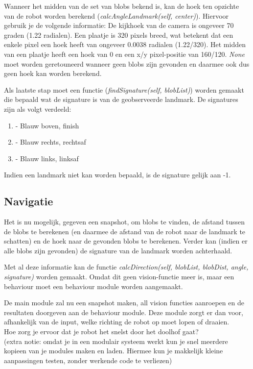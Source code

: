 \documentclass[a4paper]{article}
\begin{document}
Wanneer het midden van de set van blobs bekend is, kan de hoek ten opzichte van de robot worden berekend (\textit{calcAngleLandmark(self, center)}). Hiervoor gebruik je de volgende informatie:
De kijkhoek van de camera is ongeveer 70 graden (1.22 radialen). Een plaatje is 320 pixels breed, wat betekent dat een enkele pixel een hoek heeft van ongeveer 0.0038 radialen (1.22/320). Het midden van een plaatje heeft een hoek van 0 en een x/y pixel-positie van 160/120. \textit{None} moet worden geretouneerd wanneer geen blobs zijn gevonden en daarmee ook dus geen hoek kan worden berekend.

\newpage

Als laatste stap moet een functie (\textit{findSignature(self, blobList)}) worden gemaakt die bepaald wat de signature is van de geobserveerde landmark. De signatures zijn als volgt verdeeld:

\begin{enumerate}
\item - Blauw boven, finish
\item - Blauw rechts, rechtsaf
\item - Blauw links, linksaf
\end{enumerate}

Indien een landmark niet kan worden bepaald, is de signature gelijk aan -1.

\subsection{Navigatie}

Het is nu mogelijk, gegeven een snapshot, om blobs te vinden, de afstand tussen de blobs te berekenen (en daarmee de afstand van de robot naar de landmark te schatten) en de hoek naar de gevonden blobs te berekenen. Verder kan (indien er alle blobs zijn gevonden) de signature van de landmark worden achterhaald.

Met al deze informatie kan de functie \textit{calcDirection(self, blobList, blobDist, angle, signature)} worden gemaakt. Omdat dit geen vision-functie meer is, maar een behaviour moet een behaviour module worden aangemaakt.

De main module zal nu een snapshot maken, all vision functies aanroepen en de resultaten doorgeven aan de behaviour module. Deze module zorgt er dan voor, afhankelijk van de input, welke richting de robot op moet lopen of draaien.
\\

Hoe zorg je ervoor dat je robot het snelst door het doolhof gaat?\\

(extra notie: omdat je in een modulair systeem werkt kun je snel meerdere kopieen van je modules maken en laden. Hiermee kun je makkelijk kleine aanpassingen testen, zonder werkende code te verliezen)
\end{document}
